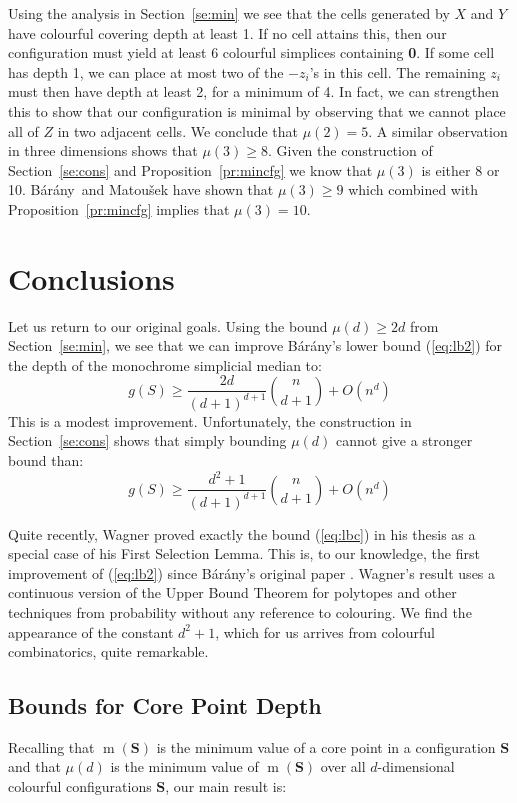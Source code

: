 \documentclass[epsbox,12pt,reqno]{amsart}
\theoremstyle{definition}
\theoremstyle{remark}
\def\S{\mathbf{S}}
\def\bara{B\'ar\'any}
\def\m{\operatorname{m}}
\def\zero{{\bf 0}}
\begin{document}
Using the analysis in Section~\ref{se:min} we see that the
cells generated by $X$ and $Y$ have colourful covering depth at
least 1.  If no cell attains this, then our configuration must
yield at least 6 colourful simplices containing \zero.
If some cell has depth 1, we can place at most two of the
$-z_i$'s in this cell.  The remaining $z_i$ must then have
depth at least 2, for a minimum of 4.  In fact, we can strengthen
this to show that our configuration is minimal  
by observing that we cannot place all of $Z$ in two adjacent cells.
We conclude that $\mu(2)=5$.
A similar observation in three dimensions shows that 
$\mu(3) \ge 8$.  Given the construction of Section~\ref{se:cons}
and Proposition~\ref{pr:mincfg} we know that $\mu(3)$ is
either 8 or 10.
\bara~and Matou{\v s}ek \cite{BM06} have shown that
$\mu(3) \ge 9$ which combined with Proposition~\ref{pr:mincfg} 
implies that
$\mu(3)=10$.

%
%
\section{Conclusions}\label{se:dis}
Let us return to our original goals.  Using the bound $\mu(d) \ge 2d$
from Section~\ref{se:min}, we see that we can improve \bara's
lower bound (\ref{eq:lb2}) for
the depth of the monochrome simplicial median to:
\begin{equation}\label{eq:lb3}
g(S) \ge \frac{2d}{(d+1)^{d+1}}\binom{n}{d+1} + O(n^d)
\end{equation}
This is a modest improvement.  Unfortunately, the construction
in Section~\ref{se:cons} shows that simply bounding $\mu(d)$ 
cannot give a stronger bound than:
\begin{equation}\label{eq:lbc}
g(S) \ge \frac{d^2+1}{(d+1)^{d+1}}\binom{n}{d+1} + O(n^d)
\end{equation}

Quite recently, Wagner proved exactly the bound (\ref{eq:lbc}) in
his thesis \cite{Wag03} as a special case of his
First Selection Lemma.  
This is, to our knowledge, the first improvement of
(\ref{eq:lb2}) since \bara's original paper \cite{Bar82}.
Wagner's result uses a continuous version of the 
Upper Bound Theorem for polytopes and other techniques from
probability without any reference to colouring.  
We find the appearance of the constant $d^2+1$, which for
us arrives from colourful combinatorics, quite remarkable.

\subsection{Bounds for Core Point Depth}
Recalling that $\m(\S)$ is the minimum value of a
core point in a configuration $\S$ and that $\mu(d)$ is the
minimum value of $\m(\S)$ over all $d$-dimensional 
colourful configurations $\S$, our main result is:
\end{document}
